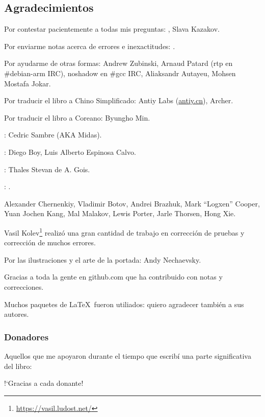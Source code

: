 \subsection*{Agradecimientos}

Por contestar pacientemente a todas mis preguntas: \HERMIT, Slava  Kazakov.

Por enviarme notas acerca de errores e inexactitudes: \PeopleMistakesInaccuracies{}.

Por ayudarme de otras formas:
Andrew Zubinski,
Arnaud Patard (rtp en \#debian-arm IRC),
noshadow en \#gcc IRC,
Aliaksandr Autayeu,
Mohsen Mostafa Jokar.

Por traducir el libro a Chino Simplificado:
Antiy Labs (\href{http://antiy.cn}{antiy.cn}), Archer.

Por traducir el libro a Coreano: Byungho Min.

\ESph{}: Cedric Sambre (AKA Midas).

\ESph{}: Diego Boy, Luis Alberto Espinosa Calvo.

\ESph{}: Thales Stevan de A. Gois.

\ESph{}: \PeopleItalianTranslators{}.

%
Alexander  Chernenkiy,
Vladimir Botov,
Andrei Brazhuk,
Mark ``Logxen'' Cooper, Yuan Jochen Kang, Mal Malakov, Lewis Porter, Jarle Thorsen, Hong Xie.

Vasil Kolev\footnote{\url{https://vasil.ludost.net/}} realiz\'o una gran cantidad de trabajo en correcci\'on de pruebas y correcci\'on de muchos errores.

Por las ilustraciones y el arte de la portada: Andy Nechaevsky.

Gracias a toda la gente en github.com que ha contribuido con notas y correcciones.

Muchos paquetes de \LaTeX\ fueron utiliados: quiero agradecer tambi\'en a sus autores.

\subsubsection*{Donadores}

Aquellos que me apoyaron durante el tiempo que escrib\'i una parte significativa del libro:



!`Gracias a cada donante!

